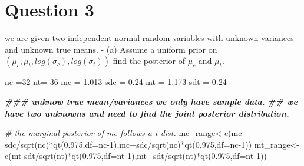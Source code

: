 \documentclass[
]{book}
\newenvironment{Shaded}{\begin{snugshade}}{\end{snugshade}}
\newcommand{\AttributeTok}[1]{\textcolor[rgb]{0.77,0.63,0.00}{#1}}
\newcommand{\CommentTok}[1]{\textcolor[rgb]{0.56,0.35,0.01}{\textit{#1}}}
\newcommand{\DecValTok}[1]{\textcolor[rgb]{0.00,0.00,0.81}{#1}}
\newcommand{\DocumentationTok}[1]{\textcolor[rgb]{0.56,0.35,0.01}{\textbf{\textit{#1}}}}
\newcommand{\FloatTok}[1]{\textcolor[rgb]{0.00,0.00,0.81}{#1}}
\newcommand{\FunctionTok}[1]{\textcolor[rgb]{0.00,0.00,0.00}{#1}}
\newcommand{\NormalTok}[1]{#1}
\newcommand{\OtherTok}[1]{\textcolor[rgb]{0.56,0.35,0.01}{#1}}
\newcommand{\SpecialCharTok}[1]{\textcolor[rgb]{0.00,0.00,0.00}{#1}}
\theoremstyle{definition}
\theoremstyle{definition}
\theoremstyle{definition}
\theoremstyle{definition}
\theoremstyle{remark}
\begin{document}
\hypertarget{question-3-1}{%
\section*{Question 3}\label{question-3-1}}

we are given two independent normal random variables with unknown variances and unknown true means.
- (a) Assume a uniform prior on \((\mu_c, \mu_t, log(\sigma_c),log(\sigma_t))\) find the posterior of \(\mu_c\) and \(\mu_t\).

\begin{Shaded}
\begin{Highlighting}[]
\NormalTok{ nc }\OtherTok{=}\DecValTok{32}
\NormalTok{ nt}\OtherTok{=} \DecValTok{36}
\NormalTok{ mc }\OtherTok{=} \FloatTok{1.013}
\NormalTok{ sdc }\OtherTok{=} \FloatTok{0.24}
\NormalTok{ mt }\OtherTok{=} \FloatTok{1.173}
\NormalTok{ sdt }\OtherTok{=} \FloatTok{0.24}
 
 \DocumentationTok{\#\#\# unknow true mean/variances  we only have sample data.}
 \DocumentationTok{\#\# we have two unknowns and need to find the joint posterior distribution.}
 
 \CommentTok{\# the marginal posterior of mc follows a t{-}dist.}
\NormalTok{  mc\_range}\OtherTok{\textless{}{-}}\FunctionTok{c}\NormalTok{(mc}\SpecialCharTok{{-}}\NormalTok{sdc}\SpecialCharTok{/}\FunctionTok{sqrt}\NormalTok{(nc)}\SpecialCharTok{*}\FunctionTok{qt}\NormalTok{(}\FloatTok{0.975}\NormalTok{,}\AttributeTok{df=}\NormalTok{nc}\DecValTok{{-}1}\NormalTok{),mc}\SpecialCharTok{+}\NormalTok{sdc}\SpecialCharTok{/}\FunctionTok{sqrt}\NormalTok{(nc)}\SpecialCharTok{*}\FunctionTok{qt}\NormalTok{(}\FloatTok{0.975}\NormalTok{,}\AttributeTok{df=}\NormalTok{nc}\DecValTok{{-}1}\NormalTok{))}
\NormalTok{   mt\_range}\OtherTok{\textless{}{-}}\FunctionTok{c}\NormalTok{(mt}\SpecialCharTok{{-}}\NormalTok{sdt}\SpecialCharTok{/}\FunctionTok{sqrt}\NormalTok{(nt)}\SpecialCharTok{*}\FunctionTok{qt}\NormalTok{(}\FloatTok{0.975}\NormalTok{,}\AttributeTok{df=}\NormalTok{nt}\DecValTok{{-}1}\NormalTok{),mt}\SpecialCharTok{+}\NormalTok{sdt}\SpecialCharTok{/}\FunctionTok{sqrt}\NormalTok{(nt)}\SpecialCharTok{*}\FunctionTok{qt}\NormalTok{(}\FloatTok{0.975}\NormalTok{,}\AttributeTok{df=}\NormalTok{nt}\DecValTok{{-}1}\NormalTok{))}


\end{Highlighting}
\end{Shaded}
\end{document}
